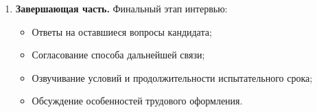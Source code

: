 \documentclass[14pt, russian]{matmex-diploma-custom}
\begin{document}
\begin{enumerate}
    \item \textbf{Завершающая часть.}
    Финальный этап интервью:
    \begin{itemize}
        \item Ответы на оставшиеся вопросы кандидата;
        \item Согласование способа дальнейшей связи;
        \item Озвучивание условий и продолжительности испытательного срока;
        \item Обсуждение особенностей трудового оформления.
    \end{itemize}
\end{enumerate}
\end{document}
